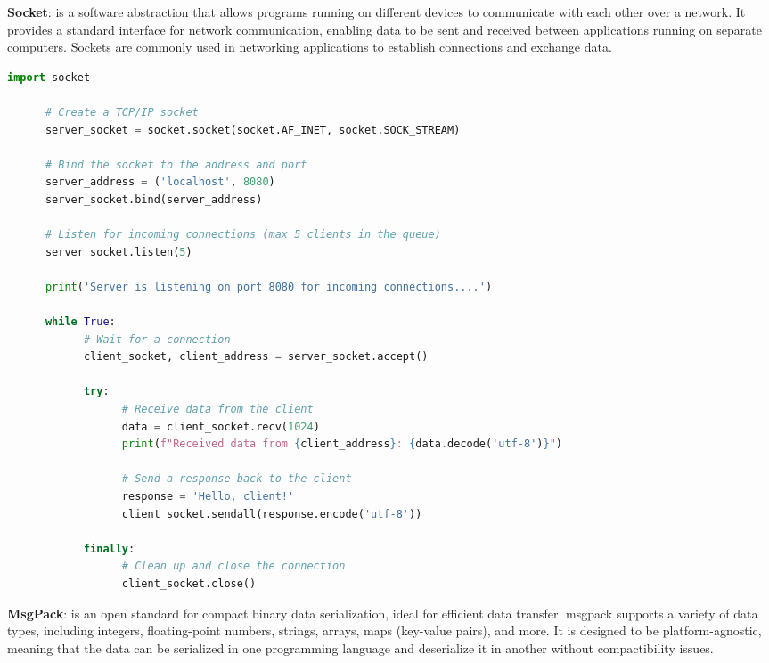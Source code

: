 \begin{multicols}{2}
    \textbf{Socket}: is a software abstraction that allows programs running on different devices to
    communicate with each other over a network. It provides a standard interface for network
    communication, enabling data to be sent and received between applications running on separate
    computers. Sockets are commonly used in networking applications to establish connections and
    exchange data.
\end{multicols}

\begin{lstlisting}[language=Python, caption=TCP Server Example Using Sockets in Python]
      import socket

      # Create a TCP/IP socket
      server_socket = socket.socket(socket.AF_INET, socket.SOCK_STREAM)

      # Bind the socket to the address and port
      server_address = ('localhost', 8080)
      server_socket.bind(server_address)

      # Listen for incoming connections (max 5 clients in the queue)
      server_socket.listen(5)

      print('Server is listening on port 8080 for incoming connections....')

      while True:
            # Wait for a connection
            client_socket, client_address = server_socket.accept()

            try:
                  # Receive data from the client
                  data = client_socket.recv(1024)
                  print(f"Received data from {client_address}: {data.decode('utf-8')}")

                  # Send a response back to the client
                  response = 'Hello, client!'
                  client_socket.sendall(response.encode('utf-8'))

            finally:
                  # Clean up and close the connection
                  client_socket.close()
\end{lstlisting}

\begin{multicols}{2}
    \textbf{MsgPack}: is an open standard for compact binary data serialization, ideal for efficient data transfer.
    \acrshort{msgpack} supports a variety of data types, including integers, floating-point numbers, strings,
    arrays, maps (key-value pairs), and more. It is designed to be platform-agnostic, meaning that the data can be
    serialized in one programming language and deserialize it in another without compactibility issues.
\end{multicols}

